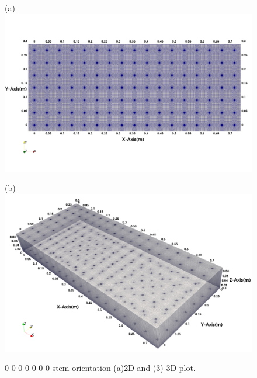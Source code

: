 \begin{figure}[H]
\begin{centering}
(a)\includegraphics[width=6in]{Figures/0000000_XY}
\par\end{centering}
\begin{centering}
(b)\includegraphics[width=6in]{Figures/0000000_3D}
\par\end{centering}
\caption{0-0-0-0-0-0-0 stem orientation (a)2D and (3) 3D plot.}
\end{figure}

